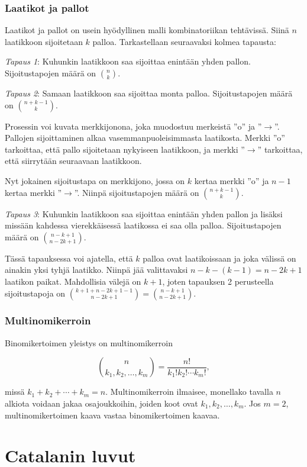 \subsubsection{Laatikot ja pallot}

Laatikot ja pallot on usein hyödyllinen malli
kombinatoriikan tehtävissä.
Siinä $n$ laatikkoon sijoitetaan $k$ palloa.
Tarkastellaan seuraavaksi kolmea tapausta:

\textit{Tapaus 1}: Kuhunkin laatikkoon saa sijoittaa
enintään yhden pallon.
Sijoitustapojen määrä on ${n \choose k}$.

\textit{Tapaus 2}: Samaan laatikkoon saa sijoittaa
monta palloa.
Sijoitustapojen määrä on ${n+k-1 \choose k}$.

Prosessin voi kuvata merkkijonona, joka muodostuu
merkeistä ''o'' ja ''$\rightarrow$''.
Pallojen sijoittaminen alkaa
vasemmanpuoleisimmasta laatikosta.
Merkki ''o'' tarkoittaa, että pallo sijoitetaan
nykyiseen laatikkoon, ja merkki
''$\rightarrow$'' tarkoittaa, että siirrytään
seuraavaan laatikkoon.

Nyt jokainen sijoitustapa on merkkijono, jossa
on $k$ kertaa merkki ''o'' ja $n-1$ kertaa
merkki ''$\rightarrow$''.
Niinpä sijoitustapojen määrä on ${n+k-1 \choose k}$.

\textit{Tapaus 3}: Kuhunkin laatikkoon saa sijoittaa
enintään yhden pallon ja lisäksi missään kahdessa
vierekkäisessä laatikossa ei saa olla palloa.
Sijoitustapojen määrä on ${n-k+1 \choose n-2k+1}$.

Tässä tapauksessa voi ajatella, että $k$ palloa
ovat laatikoissaan ja joka välissä on ainakin
yksi tyhjä laatikko.
Niinpä jää valittavaksi $n-k-(k-1)=n-2k+1$ laatikon paikat.
Mahdollisia välejä on $k+1$, joten tapauksen 2 perusteella
sijoitustapoja on ${k+1+n-2k+1-1 \choose n-2k+1} = {n-k+1 \choose n-2k+1}$.

\subsubsection{Multinomikerroin}

Binomikertoimen yleistys on multinomikerroin

\[ {n \choose k_1,k_2,\ldots,k_m} = \frac{n!}{k_1! k_2! \cdots k_m!}, \]

missä $k_1+k_2+\cdots+k_m=n$.
Multinomikerroin ilmaisee, monellako tavalla $n$ alkiota voidaan jakaa osajoukkoihin,
joiden koot ovat $k_1,k_2,\ldots,k_m$.
Jos $m=2$, multinomikertoimen kaava vastaa binomikertoimen kaavaa.

\section{Catalanin luvut}

